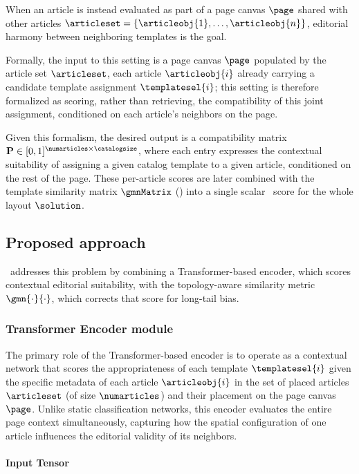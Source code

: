 When an article is instead evaluated as part of a page canvas $\page$ shared with other articles $\articleset = \{\articleobj{1}, \dots, \articleobj{n}\}$, editorial harmony between neighboring templates is the goal. 

Formally, the input to this setting is a page canvas $\page$ populated by the article set $\articleset$, each article $\articleobj{i}$ already carrying a candidate template assignment $\templatesel{i}$; this setting is therefore formalized as scoring, rather than retrieving, the compatibility of this joint assignment, conditioned on each article's neighbors on the page.

Given this formalism, the desired output is a compatibility matrix $\mathbf{P} \in [0,1]^{\numarticles \times \catalogsize}$, where each entry expresses the contextual suitability of assigning a given catalog template to a given article, conditioned on the rest of the page. These per-article scores are later combined with the template similarity matrix $\gmnMatrix$ () into a single scalar \neuralmethod\ score for the whole layout $\solution$.

\subsection{Proposed approach}

\neuralmethod\ addresses this problem by combining a Transformer-based encoder, which scores contextual editorial suitability, with the topology-aware similarity metric $\gmn{\cdot}{\cdot}$, which corrects that score for long-tail bias.

\subsubsection{Transformer Encoder module}
\label{sec:transformer_module}

The primary role of the Transformer-based encoder is to operate as a contextual network that scores the appropriateness of each template $\templatesel{i}$ given the specific metadata of each article $\articleobj{i}$ in the set of placed articles $\articleset$ (of size $\numarticles$) and their placement on the page canvas $\page$. Unlike static classification networks, this encoder evaluates the entire page context simultaneously, capturing how the spatial configuration of one article influences the editorial validity of its neighbors.

\paragraph{Input Tensor}

